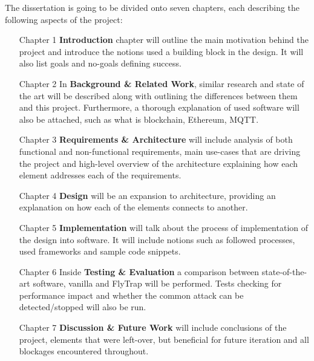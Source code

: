 The dissertation is going to be divided onto seven chapters, each describing the following aspects of the project:
\begin{itemize}[leftmargin=4.5em]
  \item[Chapter 1] \textbf{Introduction} chapter will outline the main motivation behind the project and introduce the notions used a building block in the design. It will also list goals and no-goals defining success.
  \item[Chapter 2] In \textbf{Background \& Related Work}, similar research and state of the art will be described along with outlining the differences between them and this project. Furthermore, a thorough explanation of used software will also be attached, such as what is blockchain, Ethereum, MQTT. 
  \item[Chapter 3] \textbf{Requirements \& Architecture} will include analysis of both functional and non-functional requirements, main use-cases that are driving the project and high-level overview of the architecture explaining how each element addresses each of the requirements.
  \item[Chapter 4] \textbf{Design} will be an expansion to architecture, providing an explanation on how each of the elements connects to another.
  \item[Chapter 5] \textbf{Implementation} will talk about the process of implementation of the design into software. It will include notions such as followed processes, used frameworks and sample code snippets.
  \item[Chapter 6] Inside \textbf{Testing \& Evaluation} a comparison between state-of-the-art software, vanilla and FlyTrap will be performed. Tests checking for performance impact and whether the common attack can be detected/stopped will also be run.
  \item[Chapter 7] \textbf{Discussion \& Future Work} will include conclusions of the project, elements that were left-over, but beneficial for future iteration and all blockages encountered throughout. 
\end{itemize}
